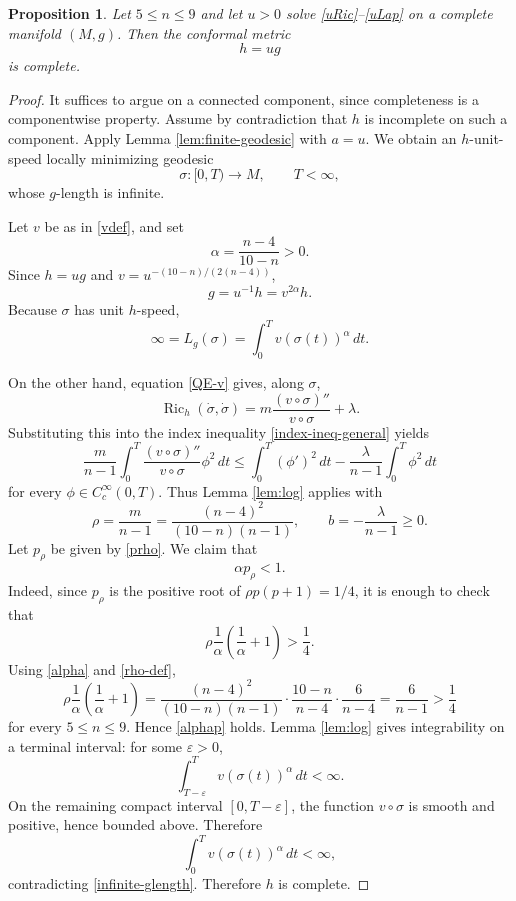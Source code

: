 \documentclass[11pt]{amsart}
\numberwithin{equation}{section}
\newtheorem{proposition}[theorem]{Proposition}
\DeclareMathOperator{\Ric}{Ric}
\begin{document}
\begin{proposition}\label{prop:h-complete}
Let $5\leq n\leq 9$ and let $u>0$ solve \eqref{uRic}--\eqref{uLap} on a complete manifold $(M,g)$.  Then the conformal metric
$$
        h=ug
$$
is complete.
\end{proposition}

\begin{proof}
It suffices to argue on a connected component, since completeness is a componentwise property.  Assume by contradiction that $h$ is incomplete on such a component.  Apply Lemma \ref{lem:finite-geodesic} with $a=u$.  We obtain an $h$-unit-speed locally minimizing geodesic
$$
        \sigma:[0,T)\to M,
        \qquad T<\infty,
$$
whose $g$-length is infinite.

Let $v$ be as in \eqref{vdef}, and set
\begin{equation}\label{alpha}
        \alpha=\frac{n-4}{10-n}>0 .
\end{equation}
Since $h=ug$ and $v=u^{-(10-n)/(2(n-4))}$,
$$
        g=u^{-1}h=v^{2\alpha}h.
$$
Because $\sigma$ has unit $h$-speed,
\begin{equation}\label{infinite-glength}
        \infty=L_g(\sigma)=\int_0^T v(\sigma(t))^\alpha\,dt .
\end{equation}

On the other hand, equation \eqref{QE-v} gives, along $\sigma$,
$$
        \Ric_h(\dot\sigma,\dot\sigma)
        =m\frac{(v\circ\sigma)''}{v\circ\sigma}+\lambda .
$$
Substituting this into the index inequality \eqref{index-ineq-general} yields
\begin{equation}\label{log-from-index}
        \frac{m}{n-1}\int_0^T\frac{(v\circ\sigma)''}{v\circ\sigma}\phi^2\,dt
        \leq
        \int_0^T(\phi')^2\,dt-\frac{\lambda}{n-1}\int_0^T\phi^2\,dt
\end{equation}
for every $\phi\in C_c^\infty(0,T)$.  Thus Lemma \ref{lem:log} applies with
\begin{equation}\label{rho-def}
        \rho=\frac{m}{n-1}
        =\frac{(n-4)^2}{(10-n)(n-1)},
        \qquad
        b=-\frac{\lambda}{n-1}\geq0 .
\end{equation}
Let $p_\rho$ be given by \eqref{prho}.  We claim that
\begin{equation}\label{alphap}
        \alpha p_\rho<1 .
\end{equation}
Indeed, since $p_\rho$ is the positive root of $\rho p(p+1)=1/4$, it is enough to check that
$$
        \rho\frac1\alpha\left(\frac1\alpha+1\right)>\frac14 .
$$
Using \eqref{alpha} and \eqref{rho-def},
$$
        \rho\frac1\alpha\left(\frac1\alpha+1\right)
        =\frac{(n-4)^2}{(10-n)(n-1)}
        \cdot\frac{10-n}{n-4}\cdot\frac6{n-4}
        =\frac6{n-1}>\frac14
$$
for every $5\leq n\leq 9$.  Hence \eqref{alphap} holds.  Lemma \ref{lem:log} gives integrability on a terminal interval: for some $\varepsilon>0$,
$$
        \int_{T-\varepsilon}^T v(\sigma(t))^\alpha\,dt<\infty .
$$
On the remaining compact interval $[0,T-\varepsilon]$, the function $v\circ\sigma$ is smooth and positive, hence bounded above.  Therefore
$$
        \int_0^T v(\sigma(t))^\alpha\,dt<\infty,
$$
contradicting \eqref{infinite-glength}.  Therefore $h$ is complete.
\end{proof}
\end{document}
